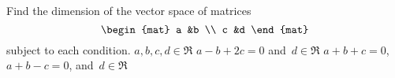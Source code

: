 
\begin{Exercise}[
name={},
title={}, 
difficulty=0,
origin={\cite{JH}}]
Find the dimension of the vector space of matrices
\begin{equation*}
\begin{mat}
a  &b  \\
c  &d
\end{mat}
\end{equation*}
subject to each condition.
\Question $a, b, c, d\in\Re$ 
\Question $a-b+2c=0$ and~$d\in\Re$
\Question $a+b+c=0$, $a+b-c=0$, and~$d\in\Re$
\end{Exercise}

